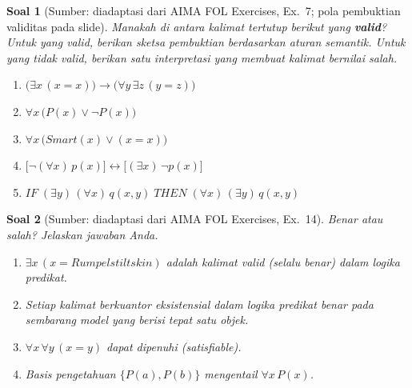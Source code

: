\documentclass[12pt,a4paper]{article}
\theoremstyle{soaljarak}
\newtheorem{soal}{Soal}
\begin{document}
\begin{soal}[\normalfont Sumber: diadaptasi dari AIMA FOL Exercises, Ex.~7; pola pembuktian validitas pada slide]
  Manakah di antara kalimat tertutup berikut yang \textbf{valid}?
  Untuk yang valid, berikan sketsa pembuktian berdasarkan aturan semantik.
  Untuk yang tidak valid, berikan satu interpretasi yang membuat kalimat bernilai salah.
  \begin{enumerate}
    \item \(\bigl(\exists x\,(x=x)\bigr) \rightarrow \bigl(\forall y\,\exists z\,(y=z)\bigr)\)
    \item \(\forall x\,\bigl(P(x) \vee \neg P(x)\bigr)\)
    \item \(\forall x\,\bigl(\mathit{Smart}(x) \vee (x=x)\bigr)\)
    \item \(\bigl[\neg(\forall x)\,p(x)\bigr] \leftrightarrow \bigl[(\exists x)\,\neg p(x)\bigr]\)
    \item \(\mathit{IF}\; (\exists y)\,(\forall x)\,q(x,y)\; \mathit{THEN}\; (\forall x)\,(\exists y)\,q(x,y)\)
  \end{enumerate}
\end{soal}

\begin{soal}[\normalfont Sumber: diadaptasi dari AIMA FOL Exercises, Ex.~14]
  Benar atau salah?
  Jelaskan jawaban Anda.
  \begin{enumerate}
    \item \(\exists x\,(x = \mathit{Rumpelstiltskin})\) adalah kalimat valid (selalu benar) dalam logika predikat.
    \item Setiap kalimat berkuantor eksistensial dalam logika predikat benar pada sembarang model yang berisi tepat satu objek.
    \item \(\forall x\,\forall y\,(x=y)\) dapat dipenuhi (\textit{satisfiable}).
    \item Basis pengetahuan \(\{P(a), P(b)\}\) mengentail \(\forall x\,P(x)\).
  \end{enumerate}
\end{soal}
\end{document}
